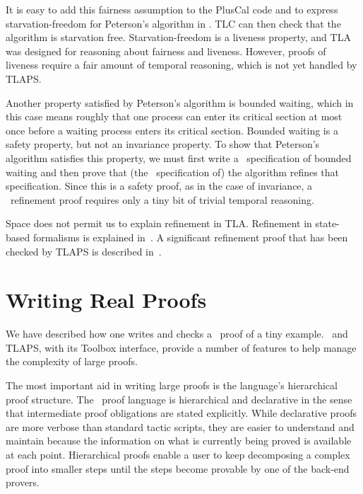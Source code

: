 \documentclass[a4paper]{llncs}
\begin{document}
It is easy to add this fairness assumption to the PlusCal code and to
express starvation-freedom for Peterson's algorithm in \tlaplus.  TLC
can then check that the algorithm is starvation free.
Starvation-freedom is a liveness property, and TLA was designed for
reasoning about fairness and liveness.  However, proofs of liveness
require a fair amount of temporal reasoning, which is not yet handled
by TLAPS\@.  

Another property satisfied by Peterson's algorithm is bounded waiting,
which in this case means roughly that one process can enter its
critical section at most once before a waiting process enters its
critical section.  Bounded waiting is a safety property, but not
an invariance property.  To show that Peterson's algorithm satisfies
this property, we must first write a \tlaplus\ specification of
bounded waiting and then prove that (the \tlaplus\ specification of)
the algorithm refines that specification.  Since this is a safety
proof, as in the case of invariance, a \tlaplus\ refinement proof 
requires only a tiny bit of trivial temporal reasoning.



Space does not permit us to explain refinement in TLA\@.  
Refinement in state-based formalisms is explained
in~\cite{abadi:existence}.  A significant
refinement proof that has been checked by
TLAPS is described in~\cite{lamport:byzantine-paxos}.

\section{Writing Real Proofs}
\label{sec:real-proofs}

We have described how one writes and checks a \tlaplus\ proof of a
tiny example.  \tlaplus\ and TLAPS, with its Toolbox interface,
provide a number of features to help manage the complexity of large
proofs.

The most important aid in writing large proofs is the language's
hierarchical proof structure.  The \tlaplus\ proof language is
hierarchical and declarative in the sense that intermediate proof
obligations are stated explicitly.  While declarative proofs are more
verbose than standard tactic scripts, they are easier to understand
and maintain because the information on what is currently being proved
is available at each point.  Hierarchical proofs enable a user to keep
decomposing a complex proof into smaller steps until the steps become
provable by one of the back-end provers.
\end{document}
